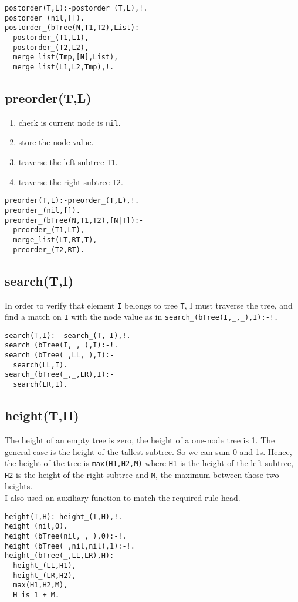 \documentclass{article}
\begin{document}
    \begin{verbatim}
postorder(T,L):-postorder_(T,L),!.
postorder_(nil,[]).
postorder_(bTree(N,T1,T2),List):-
  postorder_(T1,L1),
  postorder_(T2,L2),
  merge_list(Tmp,[N],List),
  merge_list(L1,L2,Tmp),!.
    \end{verbatim}

  \subsection*{preorder(T,L)}
    \begin{enumerate}
      \item check is current node is \texttt{nil}.
      \item store the node value.
      \item traverse the left subtree \texttt{T1}.
      \item traverse the right subtree \texttt{T2}.
    \end{enumerate}

    \begin{verbatim}
preorder(T,L):-preorder_(T,L),!.
preorder_(nil,[]).
preorder_(bTree(N,T1,T2),[N|T]):-
  preorder_(T1,LT),
  merge_list(LT,RT,T),
  preorder_(T2,RT).
    \end{verbatim}

  \subsection*{search(T,I)}
    In order to verify that element \texttt{I} belongs to tree \texttt{T}, I must
    traverse the tree, and find a match on \texttt{I} with the node value as in \texttt{search_(bTree(I,_,_),I):-!.}
    \begin{verbatim}
search(T,I):- search_(T, I),!.
search_(bTree(I,_,_),I):-!.
search_(bTree(_,LL,_),I):-
  search(LL,I).
search_(bTree(_,_,LR),I):-
  search(LR,I).
    \end{verbatim}

  \subsection*{height(T,H)}
    The height of an empty tree is zero, the height of a one-node tree is 1.
    The general case is the height of the tallest subtree. So we can sum 0 and 1s.
    Hence, the height of the tree is \texttt{max(H1,H2,M)} where \texttt{H1} is the
    height of the left subtree, \texttt{H2} is the height of the right subtree and \texttt{M},
    the maximum between those two heights. \\
    I also used an auxiliary function to match the required rule head.
    \begin{verbatim}
height(T,H):-height_(T,H),!.
height_(nil,0).
height_(bTree(nil,_,_),0):-!.
height_(bTree(_,nil,nil),1):-!.
height_(bTree(_,LL,LR),H):-
  height_(LL,H1),
  height_(LR,H2),
  max(H1,H2,M),
  H is 1 + M.
    \end{verbatim}
\end{document}
